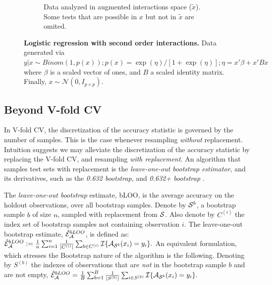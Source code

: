 \documentclass[oupdraft]{bio}
\begin{document}
\begin{figure}[th]
\begin{subfigure}[t]{.45\columnwidth}
		\caption{Data analyzed in augmented interactions space ($\tilde x$).
		Some tests that are possible in $x$ but not in $\tilde{x}$ are omited.}
		\label{fig:interactions-in-augmented-space}
	\end{subfigure}
	\caption{\textbf{Logistic regression with second order interactions.} 
		Data generated via $y|x \sim Binom(1,p(x));
		p(x)=\exp(\eta)/[1+\exp(\eta)];
		\eta=x'\beta+x'Bx$ where 
		$\beta$ is a scaled vector of ones, and $B$ a scaled identity matrix.
		Finally, $x\sim \mathcal{N}(0,I_{p\times p})$.
	 } 
	\label{fig:logistic-main-and-interactions}
\end{figure}





\subsection{Beyond V-fold CV}
\label{sec:bootstrap}

In V-fold CV, the discretization of the accuracy statistic is governed by the number of samples. 
This is the case whenever resampling \emph{without} replacement. 
Intuition suggests we may alleviate the discretization of the accuracy statistic by replacing the V-fold CV, and resampling \emph{with replacement}.
An algorithm that samples test sets with replacement is the \emph{leave-one-out bootstrap estimator},  and its derivatives, such as the \emph{0.632 bootstrap}, and \emph{0.632+ bootstrap} \citep[Sec 7.11]{hastie_elements_2003}.
\begin{definition}[bLOO]
	\label{def:bloo}
	The \emph{leave-one-out bootstrap} estimate, bLOO, is the average accuracy on the holdout observations, over all bootstrap samples. 
	Denote by $\mathcal{S}^b$, a bootstrap sample $b$ of size $n$, sampled with replacement from $\mathcal{S}$. 
	Also denote by $C^{(i)}$ the index set of bootstrap samples not containing observation $i$.
	The leave-one-out bootstrap estimate, $\hat{\mathcal{E}}_{\mathcal{A}}^{bLOO}$,  is defined as:
	$\hat{\mathcal{E}}_{\mathcal{A}}^{bLOO}:= \frac 1n \sum_{i=1}^{n} \frac{1}{|C^{(i)}|} \sum_{b \in C^{(i)}} \mathcal{I}{\{ \mathcal{A}_{\mathcal{S}^b}(x_i)=y_i \}}.$
	An equivalent formulation, which stresses the Bootstrap nature of the algorithm is the following. 
	Denoting by $S^{(b)}$ the indexes of observations that are \emph{not} in the bootstrap sample $b$ and are not empty, 
	$\hat{\mathcal{E}}_{\mathcal{A}}^{bLOO} = \frac 1B \sum_{b=1}^{B} \frac{1}{|S^{(b)}|} \sum_{i \in S^{(b)}} \mathcal{I}{\{ \mathcal{A}_{\mathcal{S}^b}(x_i)=y_i \}}.$
\end{definition}
\end{document}
